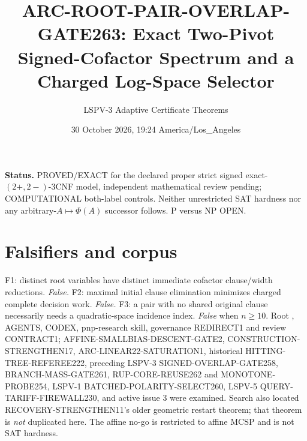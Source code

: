 \documentclass[11pt]{article}
\title{ARC-ROOT-PAIR-OVERLAP-GATE263: Exact Two-Pivot Signed-Cofactor Spectrum and a Charged Log-Space Selector}
\author{LSPV-3 Adaptive Certificate Theorems}
\date{30 October 2026, 19:24 America/Los\_Angeles}
\begin{document}
\maketitle
\noindent\textbf{Status.} PROVED/EXACT for the declared proper strict signed exact-$(2+,2-)$-3CNF model, independent mathematical review pending; COMPUTATIONAL both-label controls. Neither unrestricted SAT hardness nor any arbitrary-$A\mapsto\Phi(A)$ successor follows. P versus NP OPEN.
\section{Falsifiers and corpus}
F1: distinct root variables have distinct immediate cofactor clause/width reductions. \emph{False.}
F2: maximal initial clause elimination minimizes charged complete decision work. \emph{False.}
F3: a pair with no shared original clause necessarily needs a quadratic-space incidence index. \emph{False} when $n\ge10$.
Root , AGENTS, CODEX, pnp-research skill, governance REDIRECT1 and review CONTRACT1; AFFINE-SMALLBIAS-DESCENT-GATE2, CONSTRUCTION-STRENGTHEN17, ARC-LINEAR22-SATURATION1, historical HITTING-TREE-REFEREE222, preceding LSPV-3 SIGNED-OVERLAP-GATE258, BRANCH-MASS-GATE261, RUP-CORE-REUSE262 and MONOTONE-PROBE254, LSPV-1 BATCHED-POLARITY-SELECT260, LSPV-5 QUERY-TARIFF-FIREWALL230, and active issue 3 were examined. Search also located RECOVERY-STRENGTHEN11's older geometric restart theorem; that theorem is \emph{not} duplicated here. The affine no-go is restricted to affine MCSP and is not SAT hardness.
\end{document}
